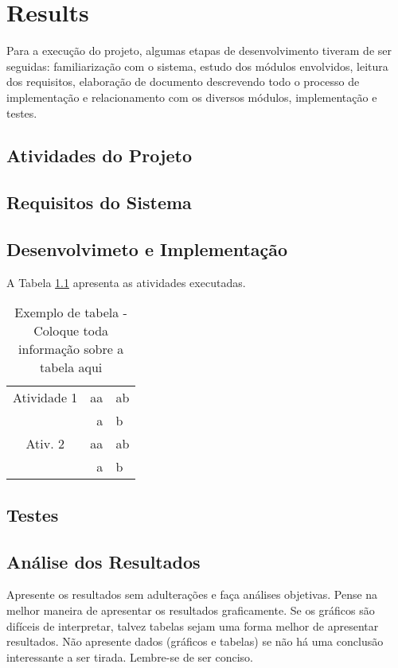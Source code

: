 \chapter{Results}

Para a execução do projeto, algumas etapas de desenvolvimento tiveram de ser seguidas: familiarização com o sistema, estudo dos módulos envolvidos, leitura dos requisitos, elaboração de documento descrevendo todo o processo de implementação e relacionamento com os diversos módulos, implementação e testes.


\section{Atividades do Projeto}
\label{metodo3}

\section {Requisitos do Sistema}
\label{req}


\section{Desenvolvimeto e Implementação}

A Tabela \ref{tab:tabela} apresenta as atividades executadas.

\begin{table}
\centering
\begin{tabular}{|c|r|l|}\hline
		Atividade 1 & aa  & ab  \\ 
					 & a & b \\ \hline
		Ativ. 2  & aa & ab \\			
					 &  a & b \\ \hline
		\end{tabular}
	\caption{Exemplo de tabela - Coloque toda informação sobre a tabela aqui}
	\label{tab:tabela}
\end{table}

\section{Testes}

\section{Análise dos Resultados}

Apresente os resultados sem adulterações e faça análises objetivas. Pense na melhor maneira de apresentar os resultados graficamente. Se os gráficos são difíceis de interpretar, talvez tabelas sejam uma forma melhor de apresentar resultados. Não apresente dados (gráficos e tabelas) se não há uma conclusão interessante a ser tirada. Lembre-se de ser conciso.

